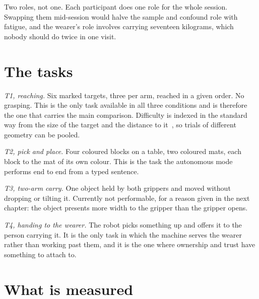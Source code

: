 Two roles, not one. Each participant does one role for the whole session.
Swapping them mid-session would halve the sample and confound role with
fatigue, and the wearer's role involves carrying seventeen kilograms, which
nobody should do twice in one visit.

\section{The tasks}

\emph{T1, reaching.} Six marked targets, three per arm, reached in a given
order. No grasping. This is the only task available in all three conditions
and is therefore the one that carries the main comparison. Difficulty is
indexed in the standard way from the size of the target and the distance to
it~\cite{fitts1954information}, so trials of different geometry can be pooled.

\emph{T2, pick and place.} Four coloured blocks on a table, two coloured mats,
each block to the mat of its own colour. This is the task the autonomous mode
performs end to end from a typed sentence.

\emph{T3, two-arm carry.} One object held by both grippers and moved without
dropping or tilting it. Currently not performable, for a reason given in the
next chapter: the object presents more width to the gripper than the gripper
opens.

\emph{T4, handing to the wearer.} The robot picks something up and offers it
to the person carrying it. It is the only task in which the machine serves the
wearer rather than working past them, and it is the one where ownership and
trust have something to attach to.

\section{What is measured}

